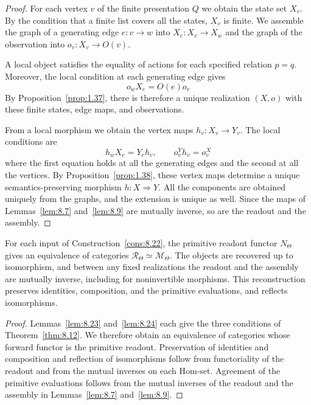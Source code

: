 \begin{proof}

For each vertex $v$ of the finite presentation $Q$ we obtain the state set $X_v$.
By the condition that a finite list covers all the states, $X_v$ is finite.
We assemble the graph of a generating edge $e:v\to w$ into $X_e:X_v\to X_w$ and the graph of
the observation into $o_v:X_v\to O(v)$.

A local object satisfies the equality of actions for each specified relation $p=q$.
Moreover, the local condition at each generating edge gives
\begin{equation*}
o_wX_e=O(e)o_v
\tag{8.23}\label{eq:8.23}
\end{equation*}
By Proposition~\ref{prop:1.37}, there is therefore a unique realization $(X,o)$ with these
finite states, edge maps, and observations.

From a local morphism we obtain the vertex maps $h_v:X_v\to Y_v$.
The local conditions are
\begin{equation*}
h_wX_e=Y_eh_v,\qquad
o_v^Yh_v=o_v^X
\tag{8.24}\label{eq:8.24}
\end{equation*}
where the first equation holds at all the generating edges and the second at all the vertices.
By Proposition~\ref{prop:1.38}, these vertex maps determine a unique semantics-preserving
morphism $h:X\Rightarrow Y$.
All the components are obtained uniquely from the graphs, and the extension is unique as
well.
Since the maps of Lemmas~\ref{lem:8.7} and~\ref{lem:8.9} are mutually inverse, so are
the readout and the assembly.

\end{proof}

\begin{corollary}\label{cor:8.25}

For each input of Construction~\ref{cons:8.22}, the primitive readout functor $N_\Theta$ gives
an equivalence of categories $\mathcal{R}_\Theta\simeq\mathcal{M}_\Theta$.
The objects are recovered up to isomorphism, and between any fixed realizations the readout
and the assembly are mutually inverse, including for noninvertible morphisms.
This reconstruction preserves identities, composition, and the primitive evaluations, and
reflects isomorphisms.

\end{corollary}

\begin{proof}

Lemmas~\ref{lem:8.23} and~\ref{lem:8.24} each give the three conditions of
Theorem~\ref{thm:8.12}.
We therefore obtain an equivalence of categories whose forward functor is the primitive
readout.
Preservation of identities and composition and reflection of isomorphisms follow from
functoriality of the readout and from the mutual inverses on each Hom-set.
Agreement of the primitive evaluations follows from the mutual inverses of the readout and the
assembly in Lemmas~\ref{lem:8.7} and~\ref{lem:8.9}.

\end{proof}

